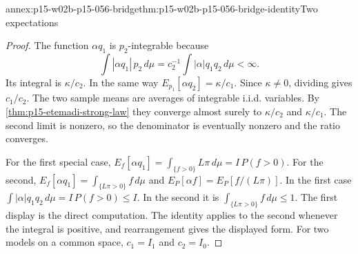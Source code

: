 \begin{annexitem}{annex:p15-w02b-p15-056-bridge}{thm:p15-w02b-p15-056-bridge-identity}{Two expectations}
\begin{proof}
The function \(\alpha q_1\) is \(p_2\)-integrable because
\[
 \int|\alpha q_1|\,p_2\,d\mu=c_2^{-1}\int|\alpha|q_1q_2\,d\mu<\infty .
\]
Its integral is \(\kappa/c_2\). In the same way \(E_{p_1}[\alpha q_2]=\kappa/c_1\).
Since \(\kappa\neq0\), dividing gives \(c_1/c_2\). The two sample means
are averages of integrable i.i.d. variables. By
\cref{thm:p15-etemadi-strong-law} they converge almost surely to
\(\kappa/c_2\) and \(\kappa/c_1\). The second limit is nonzero, so the
denominator is eventually nonzero and the ratio converges.

For the first special case,
\(E_f[\alpha q_1]=\int_{\{f>0\}}L\pi\,d\mu=I\,P(f>0)\). For the second,
\(E_f[\alpha q_1]=\int_{\{L\pi>0\}}f\,d\mu\) and
\(E_P[\alpha f]=E_P[f/(L\pi)]\). In the first case
\(\int|\alpha|q_1q_2\,d\mu=I\,P(f>0)\leq I\). In the second it is
\(\int_{\{L\pi>0\}}f\,d\mu\leq1\). The first display is the direct
computation. The identity applies to the second whenever the integral is
positive, and rearrangement gives the displayed form. For two models on
a common space, \(c_1=I_1\) and \(c_2=I_0\).
\end{proof}
\end{annexitem}

